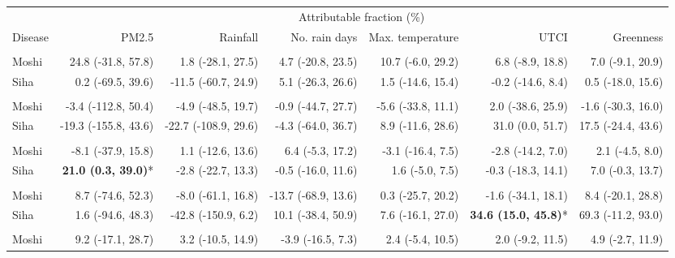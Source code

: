 \begin{table}[t]
\fontsize{12.0pt}{14.4pt}\selectfont
\begin{tabular*}{\linewidth}{@{\extracolsep{\fill}}l|rrrrrr}
\toprule
 & \multicolumn{6}{c}{Attributable fraction (\%)} \\ 
\cmidrule(lr){2-7}
Disease & PM2.5 & Rainfall & No. rain days & Max. temperature & UTCI & Greenness \\ 
\midrule\addlinespace[2.5pt]
\multicolumn{7}{l}{Pneumonia, Severe} \\[2.5pt] 
\midrule\addlinespace[2.5pt]
Moshi & 24.8 (-31.8, 57.8) & 1.8 (-28.1, 27.5) & 4.7 (-20.8, 23.5) & 10.7 (-6.0, 29.2) & 6.8 (-8.9, 18.8) & 7.0 (-9.1, 20.9) \\ 
Siha & 0.2 (-69.5, 39.6) & -11.5 (-60.7, 24.9) & 5.1 (-26.3, 26.6) & 1.5 (-14.6, 15.4) & -0.2 (-14.6, 8.4) & 0.5 (-18.0, 15.6) \\ 
\midrule\addlinespace[2.5pt]
\multicolumn{7}{l}{Tuberculosis} \\[2.5pt] 
\midrule\addlinespace[2.5pt]
Moshi & -3.4 (-112.8, 50.4) & -4.9 (-48.5, 19.7) & -0.9 (-44.7, 27.7) & -5.6 (-33.8, 11.1) & 2.0 (-38.6, 25.9) & -1.6 (-30.3, 16.0) \\ 
Siha & -19.3 (-155.8, 43.6) & -22.7 (-108.9, 29.6) & -4.3 (-64.0, 36.7) & 8.9 (-11.6, 28.6) & 31.0 (0.0, 51.7) & 17.5 (-24.4, 43.6) \\ 
\midrule\addlinespace[2.5pt]
\multicolumn{7}{l}{Skin Infection - Fungal} \\[2.5pt] 
\midrule\addlinespace[2.5pt]
Moshi & -8.1 (-37.9, 15.8) & 1.1 (-12.6, 13.6) & 6.4 (-5.3, 17.2) & -3.1 (-16.4, 7.5) & -2.8 (-14.2, 7.0) & 2.1 (-4.5, 8.0) \\ 
Siha & \textbf{21.0 (0.3, 39.0)}* & -2.8 (-22.7, 13.3) & -0.5 (-16.0, 11.6) & 1.6 (-5.0, 7.5) & -0.3 (-18.3, 14.1) & 7.0 (-0.3, 13.7) \\ 
\midrule\addlinespace[2.5pt]
\multicolumn{7}{l}{Malnutrition} \\[2.5pt] 
\midrule\addlinespace[2.5pt]
Moshi & 8.7 (-74.6, 52.3) & -8.0 (-61.1, 16.8) & -13.7 (-68.9, 13.6) & 0.3 (-25.7, 20.2) & -1.6 (-34.1, 18.1) & 8.4 (-20.1, 28.8) \\ 
Siha & 1.6 (-94.6, 48.3) & -42.8 (-150.9, 6.2) & 10.1 (-38.4, 50.9) & 7.6 (-16.1, 27.0) & \textbf{34.6 (15.0, 45.8)}* & 69.3 (-11.2, 93.0) \\ 
\midrule\addlinespace[2.5pt]
\multicolumn{7}{l}{Peptic Ulcers} \\[2.5pt] 
\midrule\addlinespace[2.5pt]
Moshi & 9.2 (-17.1, 28.7) & 3.2 (-10.5, 14.9) & -3.9 (-16.5, 7.3) & 2.4 (-5.4, 10.5) & 2.0 (-9.2, 11.5) & 4.9 (-2.7, 11.9) \\ 

\end{tabular*}
\end{table}
